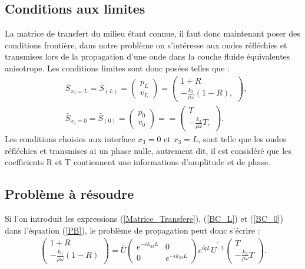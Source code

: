 \documentclass[12pt]{report}
\begin{document}
\subsection{Conditions aux limites}
\label{Ch_Prop_S_Pb_SS_BC}
    La matrice de transfert du milieu étant connue, il faut donc maintenant poser des conditions frontière, dans notre problème on s'intéresse aux ondes réfléchies et transmises lors de la propagation d'une onde dans la couche fluide équivalentes anisotrope. Les conditions limites sont donc posées telles que :
    \begin{align}
    &\bar{S}_{x_3=L}=\bar{S}_{(L)}=\begin{pmatrix}
    						p_L \\ v_L
    					\end{pmatrix} = \begin{pmatrix}
    										1+R \\ -\frac{k_3}{\rho \omega}(1-R),
    									\end{pmatrix},\label{BC_L} \\
  	&\bar{S}_{x_3=0}=\bar{S}_{(0)}=\begin{pmatrix}
    						p_0 \\ v_0
    					\end{pmatrix} ==\begin{pmatrix}
    						T \\ -\frac{k_3}{\rho \omega}T,
    					\end{pmatrix}.\label{BC_0}
    \end{align}    
     Les conditions choisies aux interface $x_3=0$ et $x_3=L$, sont telle que les ondes réfléchies et transmises ai un phase nulle, autrement dit, il est considéré que les coefficients R et T contiennent une informations d'amplitude et de phase.    
        
\subsection{Problème à résoudre}    
    Si l'on introduit les expressions (\ref{Matrice_Transfere}), (\ref{BC_L}) et (\ref{BC_0}) dans l'équation (\ref{PB}), le problème de propagation peut donc s'écrire :
    \begin{align}
        \begin{pmatrix}
    	    1+R \\ -\frac{k_3}{\rho \omega}(1-R)
    	\end{pmatrix}=\bar{\bar{U}}\begin{pmatrix}
                        e^{-ik_{33}L} & 0 \\ 0 & e^{-ik_{33}L} 
                      \end{pmatrix} e^{i\tilde{q}L}\bar{\bar{U^{-1}}}\begin{pmatrix}
    					                            	T \\ -\frac{k_3}{\rho \omega}T
    				                                        	\end{pmatrix}.\label{Eq_Prop}
    \end{align}
\end{document}
